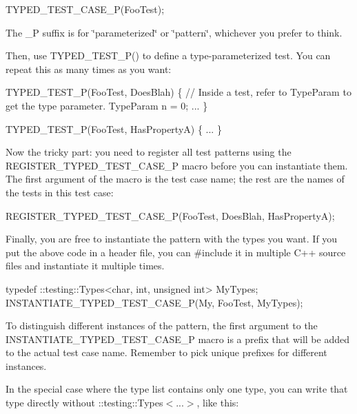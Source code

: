 \begin{DoxyCode}
TYPED\_TEST\_CASE\_P(FooTest);
\end{DoxyCode}


The {\ttfamily \+\_\+P} suffix is for \char`\"{}parameterized\char`\"{} or \char`\"{}pattern\char`\"{}, whichever you prefer to think.

Then, use {\ttfamily T\+Y\+P\+E\+D\+\_\+\+T\+E\+S\+T\+\_\+\+P()} to define a type-\/parameterized test. You can repeat this as many times as you want\+:


\begin{DoxyCode}
TYPED\_TEST\_P(FooTest, DoesBlah) \{
  // Inside a test, refer to TypeParam to get the type parameter.
  TypeParam n = 0;
  ...
\}

TYPED\_TEST\_P(FooTest, HasPropertyA) \{ ... \}
\end{DoxyCode}


Now the tricky part\+: you need to register all test patterns using the {\ttfamily R\+E\+G\+I\+S\+T\+E\+R\+\_\+\+T\+Y\+P\+E\+D\+\_\+\+T\+E\+S\+T\+\_\+\+C\+A\+S\+E\+\_\+P} macro before you can instantiate them. The first argument of the macro is the test case name; the rest are the names of the tests in this test case\+:


\begin{DoxyCode}
REGISTER\_TYPED\_TEST\_CASE\_P(FooTest,
                           DoesBlah, HasPropertyA);
\end{DoxyCode}


Finally, you are free to instantiate the pattern with the types you want. If you put the above code in a header file, you can {\ttfamily \#include} it in multiple C++ source files and instantiate it multiple times.


\begin{DoxyCode}
typedef ::testing::Types<char, int, unsigned int> MyTypes;
INSTANTIATE\_TYPED\_TEST\_CASE\_P(My, FooTest, MyTypes);
\end{DoxyCode}


To distinguish different instances of the pattern, the first argument to the {\ttfamily I\+N\+S\+T\+A\+N\+T\+I\+A\+T\+E\+\_\+\+T\+Y\+P\+E\+D\+\_\+\+T\+E\+S\+T\+\_\+\+C\+A\+S\+E\+\_\+P} macro is a prefix that will be added to the actual test case name. Remember to pick unique prefixes for different instances.

In the special case where the type list contains only one type, you can write that type directly without {\ttfamily \+::testing\+::\+Types$<$...$>$}, like this\+:


